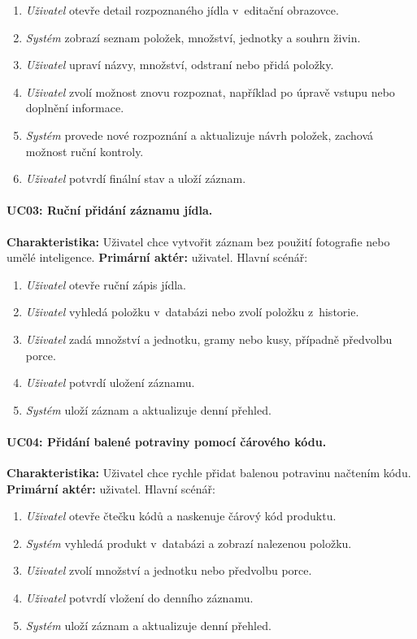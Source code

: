 \begin{enumerate}
	\item \emph{Uživatel} otevře detail rozpoznaného jídla v~editační obrazovce.
	\item \emph{Systém} zobrazí seznam položek, množství, jednotky a souhrn živin.
	\item \emph{Uživatel} upraví názvy, množství, odstraní nebo přidá položky.
	\item \emph{Uživatel} zvolí možnost znovu rozpoznat, například po úpravě vstupu nebo doplnění informace.
	\item \emph{Systém} provede nové rozpoznání a aktualizuje návrh položek, zachová možnost ruční kontroly.
	\item \emph{Uživatel} potvrdí finální stav a uloží záznam.
\end{enumerate}

\paragraph{UC03: Ruční přidání záznamu jídla.}
\textbf{Charakteristika:} Uživatel chce vytvořit záznam bez použití fotografie nebo umělé inteligence.
\textbf{Primární aktér:} uživatel.
Hlavní scénář:

\begin{enumerate}
	\item \emph{Uživatel} otevře ruční zápis jídla.
	\item \emph{Uživatel} vyhledá položku v~databázi nebo zvolí položku z~historie.
	\item \emph{Uživatel} zadá množství a jednotku, gramy nebo kusy, případně předvolbu porce.
	\item \emph{Uživatel} potvrdí uložení záznamu.
	\item \emph{Systém} uloží záznam a aktualizuje denní přehled.
\end{enumerate}

\paragraph{UC04: Přidání balené potraviny pomocí čárového kódu.}
\textbf{Charakteristika:} Uživatel chce rychle přidat balenou potravinu načtením kódu.
\textbf{Primární aktér:} uživatel.
Hlavní scénář:

\begin{enumerate}
	\item \emph{Uživatel} otevře čtečku kódů a naskenuje čárový kód produktu.
	\item \emph{Systém} vyhledá produkt v~databázi a zobrazí nalezenou položku.
	\item \emph{Uživatel} zvolí množství a jednotku nebo předvolbu porce.
	\item \emph{Uživatel} potvrdí vložení do denního záznamu.
	\item \emph{Systém} uloží záznam a aktualizuje denní přehled.
\end{enumerate}

